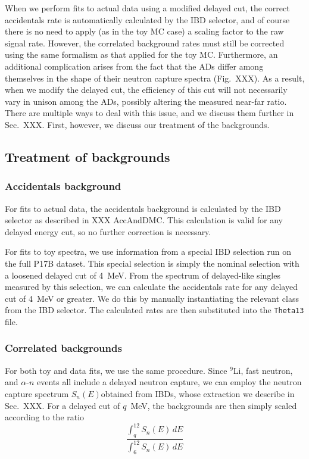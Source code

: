 \documentclass[../thesis.tex]{subfiles}
\begin{document}
When we perform fits to actual data using a modified delayed cut, the correct accidentals rate is automatically calculated by the IBD selector, and of course there is no need to apply (as in the toy MC case) a scaling factor to the raw signal rate. However, the correlated background rates must still be corrected using the same formalism as that applied for the toy MC. Furthermore, an additional complication arises from the fact that the ADs differ among themselves in the shape of their neutron capture spectra (Fig.~XXX). As a result, when we modify the delayed cut, the efficiency of this cut will not necessarily vary in unison among the ADs, possibly altering the measured near-far ratio. There are multiple ways to deal with this issue, and we discuss them further in Sec.~XXX. First, however, we discuss our treatment of the backgrounds.

\subsection{Treatment of backgrounds}
\label{sec:cutVaryDelayedCutBkgTreatment}

\subsubsection{Accidentals background}

For fits to actual data, the accidentals background is calculated by the IBD selector as described in XXX AccAndDMC. This calculation is valid for any delayed energy cut, so no further correction is necessary.

For fits to toy spectra, we use information from a special IBD selection run on the full P17B dataset. This special selection is simply the nominal selection with a loosened delayed cut of 4~MeV. From the spectrum of delayed-like singles measured by this selection, we can calculate the accidentals rate for any delayed cut of 4~MeV or greater. We do this by manually instantiating the relevant class from the IBD selector. The calculated rates are then substituted into the \texttt{Theta13} file.

\subsubsection{Correlated backgrounds}

For both toy and data fits, we use the same procedure. Since $^9$Li, fast neutron, and $\alpha$-$n$ events all include a delayed neutron capture, we can employ the neutron capture spectrum $S_n(E)$obtained from IBDs, whose extraction we describe in Sec.~XXX. For a delayed cut of $q$~MeV, the backgrounds are then simply scaled according to the ratio
\[
  \frac{\int_q^{12} S_n(E)\,dE}{\int_6^12 S_n(E)\,dE}
\]
\end{document}
